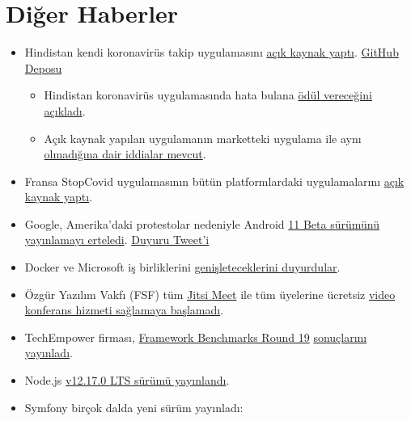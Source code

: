 \documentclass[11pt]{article}
\begin{document}
\section{Diğer Haberler}
\label{sec:org6037838}
\begin{itemize}
\item Hindistan kendi koronavirüs takip uygulamasını \href{https://techcrunch.com/2020/05/26/aarogya-setu-india-source-code-release/}{açık kaynak yaptı}. \href{https://github.com/nic-delhi/AarogyaSetu\_Android}{GitHub
Deposu}
\begin{itemize}
\item Hindistan koronavirüs uygulamasında hata bulana \href{https://www.theregister.com/2020/05/27/aarogya\_set\_open\_source\_bug\_bounty/}{ödül vereceğini açıkladı}.
\item Açık kaynak yapılan uygulamanın marketteki uygulama ile aynı \href{https://twitter.com/jackerhack/status/1266971326918455298}{olmadığına
dair iddialar mevcut}.
\end{itemize}
\item Fransa StopCovid uygulamasının bütün platformlardaki uygulamalarını \href{https://gitlab.inria.fr/stopcovid19}{açık
kaynak yaptı}.
\item Google, Amerika'daki protestolar nedeniyle Android \href{https://www.reuters.com/article/us-minneapolis-police-google-android/google-postpones-android-11-unveiling-amid-u-s-protests-idUSKBN2360AS}{11 Beta sürümünü
yayınlamayı erteledi}. \href{https://twitter.com/AndroidDev/status/1266589514937466880}{Duyuru Tweet'i}
\item Docker ve Microsoft iş birliklerini \href{https://techcrunch.com/2020/05/27/docker-expands-relationship-with-microsoft-to-ease-developer-experience-across-platforms/}{genişleteceklerini duyurdular}.
\item Özgür Yazılım Vakfı (FSF) tüm \href{https://jitsi.org/jitsi-meet/}{Jitsi Meet} ile tüm üyelerine ücretsiz \href{https://www.fsf.org/blogs/community/fsf-gives-freedom-respecting-videoconferencing-to-all-associate-members}{video
konferans hizmeti sağlamaya başlamadı}.
\item TechEmpower firması, \href{https://www.techempower.com/benchmarks/\#section=data-r19}{Framework Benchmarks Round 19} \href{https://www.techempower.com/blog/2020/05/28/framework-benchmarks-round-19/}{sonuçlarını yayınladı}.
\item Node.js \href{https://nodejs.org/en/blog/release/v12.17.0/}{v12.17.0 LTS sürümü yayınlandı}.
\item Symfony birçok dalda yeni sürüm yayınladı:

\end{itemize}
\end{document}
